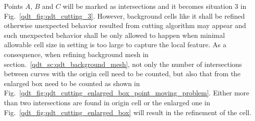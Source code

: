 Points $A$, $B$ and $C$ will be marked as intersections and it becomes situation 3 in Fig.~\ref{qdt_fig:qdt_cutting_3}.
However, background cells like it shall be refined otherwise unexpected behavior resulted from cutting algorithm may appear and such unexpected behavior shall be only allowed to happen when minimal allowable cell size in setting is too large to capture the local feature.
As a consequence, when refining background mesh in section.~\ref{qdt_sc:qdt_background_mesh}, not only the number of intersections between curves with the origin cell need to be counted, but also that from the enlarged box need to be counted as shown in Fig.~\ref{qdt_fig:qdt_cutting_enlarged_box_point_moving_problem}.
Either more than two intersections are found in origin cell or the enlarged one in Fig.~\ref{qdt_fig:qdt_cutting_enlarged_box} will result in the refinement of the cell.
